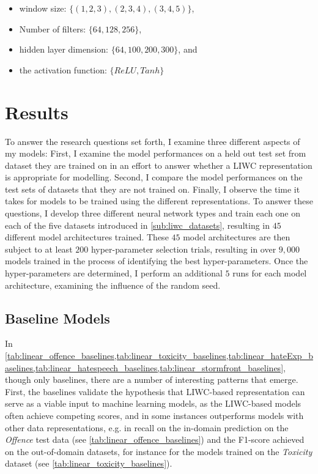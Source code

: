 \begin{itemize}
  \item window size: $\{(1, 2, 3), (2, 3, 4), (3, 4, 5)\}$,
  \item Number of filters: $\{64, 128, 256\}$,
  \item hidden layer dimension: $\{64, 100, 200, 300\}$, and
  \item the activation function: $\{ReLU, Tanh\}$
\end{itemize}

\section{Results}

To answer the research questions set forth, I examine three different aspects of my models: First, I examine the model performances on a held out test set from dataset they are trained on in an effort to answer whether a LIWC representation is appropriate for modelling.
Second, I compare the model performances on the test sets of datasets that they are not trained on. Finally, I observe the time it takes for models to be trained using the different representations.
To answer these questions, I develop three different neural network types and train each one on each of the five datasets introduced in \cref{sub:liwc_datasets}, resulting in $45$ different model architectures trained. These $45$ model architectures are then subject to at least $200$ hyper-parameter selection trials, resulting in over $9,000$ models trained in the process of identifying the best hyper-parameters. Once the hyper-parameters are determined, I perform an additional $5$ runs for each model architecture, examining the influence of the random seed.

\subsection{Baseline Models}
In \cref{tab:linear_offence_baselines,tab:linear_toxicity_baselines,tab:linear_hateExp_baselines,tab:linear_hatespeech_baselines,tab:linear_stormfront_baselines}, though only baselines, there are a number of interesting patterns that emerge.
First, the baselines validate the hypothesis that LIWC-based representation can serve as a viable input to machine learning models, as the LIWC-based models often achieve competing scores, and in some instances outperforms models with other data representations, e.g. in recall on the in-domain prediction on the \textit{Offence} test data (see \cref{tab:linear_offence_baselines}) and the F1-score achieved on the out-of-domain datasets, for instance for the models trained on the \textit{Toxicity} dataset (see \cref{tab:linear_toxicity_baselines}).


